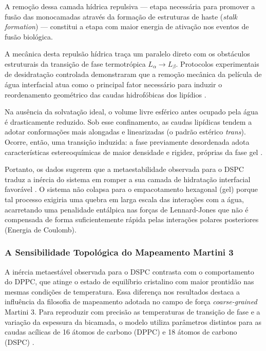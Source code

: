 \documentclass[12pt]{article} %
\begin{document}
A remoção dessa camada hídrica repulsiva — etapa necessária para promover a fusão das monocamadas através da formação de estruturas de haste (\textit{stalk formation}) — constitui a etapa com maior energia de ativação nos eventos de fusão biológica.

A mecânica desta repulsão hídrica traça um paralelo direto com os obstáculos estruturais da transição de fase termotrópica $L_\alpha \rightarrow L_\beta$. Protocolos experimentais de desidratação controlada demonstraram que a remoção mecânica da película de água interfacial atua como o principal fator necessário para induzir o reordenamento geométrico das caudas hidrofóbicas dos lipídios \cite{krok2024}.

Na ausência da solvatação ideal, o volume livre esférico antes ocupado pela água é drasticamente reduzido. Sob esse confinamento, as caudas lipídicas tendem a adotar conformações mais alongadas e linearizadas (o padrão estérico \textit{trans}). Ocorre, então, uma transição induzida: a fase previamente desordenada adota características estereoquímicas de maior densidade e rigidez, próprias da fase gel \cite{krok2024}.

Portanto, os dados sugerem que a metaestabilidade observada para o DSPC traduz a inércia do sistema em romper a sua camada de hidratação interfacial favorável \cite{katira2015}. O sistema não colapsa para o empacotamento hexagonal (gel) porque tal processo exigiria uma quebra em larga escala das interações com a água, acarretando uma penalidade entálpica nas forças de Lennard-Jones que não é compensada de forma suficientemente rápida pelas interações polares posteriores (Energia de Coulomb).


\subsubsection*{A Sensibilidade Topológica do Mapeamento Martini 3}

A inércia metaestável observada para o DSPC contrasta com o comportamento do DPPC, que atinge o estado de equilíbrio cristalino com maior prontidão nas mesmas condições de temperatura. Essa diferença nos resultados destaca a influência da filosofia de mapeamento adotada no campo de força \textit{coarse-grained} Martini 3. Para reproduzir com precisão as temperaturas de transição de fase e a variação da espessura da bicamada, o modelo utiliza parâmetros distintos para as caudas acílicas de 16 átomos de carbono (DPPC) e 18 átomos de carbono (DSPC) \cite{marrink2022, ramirez2025}.
\end{document}
